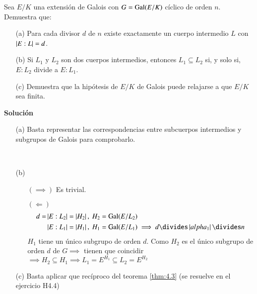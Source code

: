 \begin{ex}[H4.11]
    Sea $E/K$ una extensión de Galois con $G = \mathrm{Gal}(E/K)$ cíclico de orden $n$. Demuestra que:
    \begin{itemize}
        \item[(a)] Para cada divisor $d$ de $n$ existe exactamente un cuerpo intermedio $L$ con $\left|E:L\right| = d$.
        \item[(b)] Si $L_1$ y $L_2$ son dos cuerpos intermedios, entonces $L_1 \subseteq L_2$ si, y solo si, $E:L_2$ divide a $E:L_1$.
        \item[(c)] Demuestra que la hipótesis de $E/K$ de Galois puede relajarse a que $E/K$ sea finita.
    \end{itemize}

    \textbf{Solución}
    \begin{itemize}
        \item[(a)] Basta representar las correspondencias entre subcuerpos intermedios y subgrupos de Galois para comprobarlo.

        \begin{center}
            \\
        \end{center}
        \item[(b)]
        \begin{itemize}
            \item[$(\implies)$] Es trivial.
            \item[$(\Longleftarrow)$]
                \begin{align*}
                    d = &\vabs{E:L_2} = \vabs{H_2},\ H_2 = \gal(E/L_2)\\
                        &\vabs{E:L_1} = \vabs{H_1},\ H_1 = \gal(E/L_1) \implies d \divides \vabs{alpha_1} \divides n
                \end{align*}
                $H_1$ tiene un único subgrupo de orden $d$. Como $H_2$ es el único subgrupo de orden $d$ de $G \implies $ tienen que coincidir $\implies H_2 \subseteq H_1 \implies L_1 = E^{H_1} \subseteq L_2 = E^{H_2}$
        \end{itemize}
        \item[(c)]
            Basta aplicar que recíproco del teorema \ref{thm:4.3} (se resuelve en el ejercicio H4.4)
    \end{itemize}
\end{ex}

